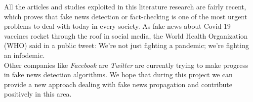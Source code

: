 \documentclass[10pt, english]{report}
\begin{document}
All the articles and studies exploited in this literature research are fairly recent, which proves that fake news detection or fact-checking is one of the most urgent problems to deal with today in every society. As fake news about Covid-19 vaccines rocket through the roof in social media, the World Health Organization (WHO) said in a public tweet: We’re not just fighting a pandemic;
we’re fighting an infodemic.\\

Other companies like \textit{Facebook} are \textit{Twitter} are currently trying to make progress in fake news detection algorithms. We hope that during this project we can provide a new approach dealing with fake news propagation and contribute positively in this area.




\end{document}
